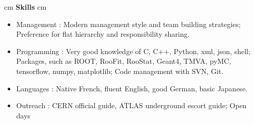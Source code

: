 \documentclass[12pt]{article}
\begin{document}
 cm
{\bf \large Skills}
 cm
\TabPositions{3.2cm}
\begin{itemize}
\itemsep0.3em
\item[] Management : \tab Modern management style and team building strategies;
 \tab  \tab Preference for flat hierarchy and responsibility sharing.
 
\item[] Programming : \tab Very good knowledge of C, C++, Python, xml, json, shell;
 \tab  \tab Packages, such as ROOT, RooFit, RooStat, Geant4, TMVA, pyMC, 
  \tab  \tab tensorflow, numpy, matplotlib;
 \tab  \tab  Code management with SVN, Git.
 
 \item[] Languages : \tab Native French, fluent English, good German, basic Japanese.
 
  \item[] Outreach : \tab  CERN official guide, ATLAS underground escort guide; Open days

\end{itemize}





\end{document}
